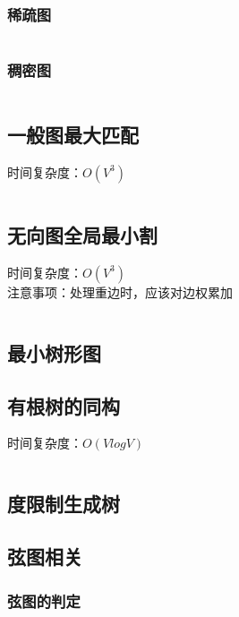 \documentclass[a4paper]{article}
\newcommand{\cppcode}[1]{
    \inputminted[mathescape]{cpp}{source/#1}
}
\begin{document}
\subsubsection{稀疏图}

\cppcode{graph-theory/minimum-cost-flow-spfa.cpp}

\subsubsection{稠密图}

\cppcode{graph-theory/minimum-cost-flow-zkw.cpp}

\subsection{一般图最大匹配}

时间复杂度：$O(V^3)$

\cppcode{graph-theory/maximum-matching-blossom.cpp}

\subsection{无向图全局最小割}

时间复杂度：$O(V^3)$\\
\indent 注意事项：处理重边时，应该对边权累加

\cppcode{graph-theory/minimum-cut-stoer-wagner.cpp}

\subsection{最小树形图}

\subsection{有根树的同构}

时间复杂度：$O(V log V)$

\cppcode{graph-theory/rooted-tree-isomorphism.cpp}

\subsection{度限制生成树}

\subsection{弦图相关}

\subsubsection{弦图的判定}
\end{document}
